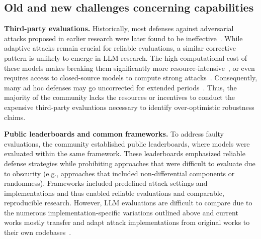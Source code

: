 \subsection{Old and new challenges concerning capabilities}\label{sec:pos-capability-challenges}



\textbf{Third-party evaluations.} Historically, most defenses against adversarial attacks proposed in earlier research were later found to be ineffective~\cite{tramer_adaptive_2020}. 
While adaptive attacks remain crucial for reliable evaluations, a similar corrective pattern is unlikely to emerge in LLM research. The high computational cost of these models makes breaking them significantly more resource-intensive~\cite{andriushchenko2024jailbreaking}, or even requires access to closed-source models to compute strong attacks~\cite{nasr2025attacker}. Consequently, many ad hoc defenses may go uncorrected for extended periods~\cite{nasr2025attacker}. Thus, the majority of the community lacks the resources or incentives to conduct the expensive third-party evaluations necessary to identify over-optimistic robustness claims.

\textbf{Public leaderboards and common frameworks.} To address faulty evaluations, the community established public leaderboards, where models were evaluated within the same framework. These leaderboards emphasized reliable defense strategies while prohibiting approaches that were difficult to evaluate due to obscurity (e.g., approaches that included non-differential components or randomness). Frameworks included predefined attack settings and implementations and thus enabled reliable evaluations and comparable, reproducible research. However, LLM evaluations are difficult to compare due to the numerous implementation-specific variations outlined above and current works mostly transfer and adapt attack implementations from original works to their own codebases~\cite{xhonneux2024efficient}. 

